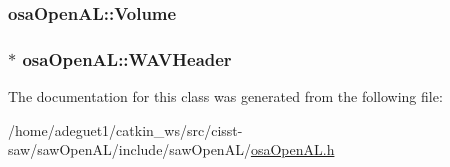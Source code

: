 \hypertarget{classosa_open_a_l_a37e986d3fd52a05679b555fff97910c7}{
\subsubsection[{Volume}]{ osa\-Open\-A\-L\-::\-Volume\hspace{0.3cm}{\ttfamily [protected]}}}\label{classosa_open_a_l_a37e986d3fd52a05679b555fff97910c7}
\hypertarget{classosa_open_a_l_af8c26f914553075852638d829c06a74d}{
\subsubsection[{W\-A\-V\-Header}]{$\ast$ osa\-Open\-A\-L\-::\-W\-A\-V\-Header\hspace{0.3cm}{\ttfamily [protected]}}}\label{classosa_open_a_l_af8c26f914553075852638d829c06a74d}


The documentation for this class was generated from the following file\-:\begin{DoxyCompactItemize}
\item 
/home/adeguet1/catkin\-\_\-ws/src/cisst-\/saw/saw\-Open\-A\-L/include/saw\-Open\-A\-L/\hyperlink{osa_open_a_l_8h}{osa\-Open\-A\-L.\-h}\end{DoxyCompactItemize}
